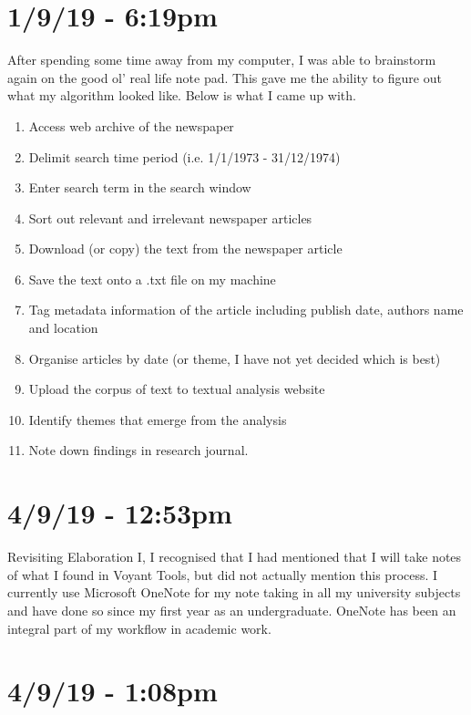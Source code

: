 \documentclass{article}
\begin{document}
\section*{1/9/19 - 6:19pm}

After spending some time away from my computer, I was able to brainstorm again on the good ol' real life note pad. This gave me the ability to figure out what my algorithm looked like. Below is what I came up with.

\begin{enumerate}
    \item Access web archive of the newspaper
    \item Delimit search time period (i.e. 1/1/1973 - 31/12/1974)
    \item Enter search term in the search window
    \item Sort out relevant and irrelevant newspaper articles
    \item Download (or copy) the text from the newspaper article
    \item Save the text onto a .txt file on my machine
    \item Tag metadata information of the article including publish date, authors name and location
    \item Organise articles by date (or theme, I have not yet decided which is best)
    \item Upload the corpus of text to textual analysis website
    \item Identify themes that emerge from the analysis
    \item Note down findings in research journal.
\end{enumerate}

\section*{4/9/19 - 12:53pm}

Revisiting Elaboration I, I recognised that I had mentioned that I will take notes of what I found in Voyant Tools, but did not actually mention this process. I currently use Microsoft OneNote for my note taking in all my university subjects and have done so since my first year as an undergraduate. OneNote has been an integral part of my workflow in academic work.

\section*{4/9/19 - 1:08pm}
\end{document}
